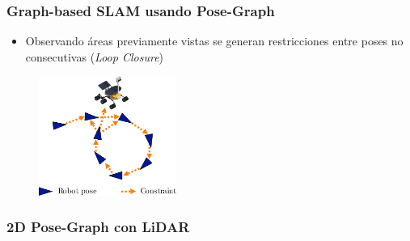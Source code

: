 \begin{frame}
    \frametitle{Graph-based SLAM usando Pose-Graph}
    
    \begin{itemize}
        \item Observando áreas previamente vistas se generan restricciones entre poses no consecutivas (\emph{Loop Closure})
    \end{itemize}
    
       \begin{figure}[!h]
        \includegraphics[width=0.4\textwidth]{images/pose_graph_loop_example.pdf}
    \end{figure}
    
\end{frame}

\begin{frame}[fragile]
    \frametitle{2D Pose-Graph con LiDAR}
        
    \begin{center}
    \end{center}
    
\end{frame}


